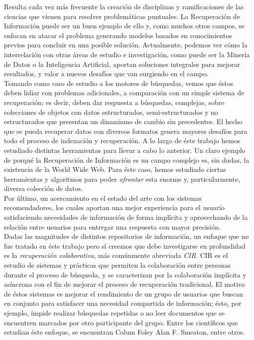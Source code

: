 Resulta cada vez más frecuente la creación de disciplinas y ramificaciones de las ciencias que vienen para resolver problemáticas puntuales. La Recuperación de Información puede ser un buen ejemplo de ello y, como muchos otros campos, se enfocan en atacar el problema generando modelos basados en conocimientos previos para concluir en una posible solución. Actualmente, podemos ver cómo la interrelación con otras áreas de estudio e investigación, como puede ser la Minería de Datos o la Inteligencia Artificial, aportan soluciones integrales para mejorar resultados, y valor a nuevos desafíos que van surgiendo en el campo. \\

Tomando como caso de estudio a los motores de búsquedas, vemos que éstos deben lidiar con problemas adicionales, a comparación con un simple sistema de recuperación; es decir, deben dar respuesta a búsquedas, complejas, sobre colecciones de objetos con datos estructurados, semi-estructurados y no estructurados que presentan un dinamismo de cambio sin precedentes. El hecho que se pueda recuperar datos con diversos formatos genera mayores desafíos para todo el proceso de indexación y recuperación. A lo largo de éste trabajo hemos estudiado distintas herramientas para llevar a cabo lo anterior. Un claro ejemplo de porqué la Recuperación de Información es un campo complejo es, sin dudas, la existencia de la World Wide Web. Para éste caso, hemos estudiado ciertas herramientas y algoritmos para poder \textit{afrontar} esta enorme y, particularmente, diversa colección de datos. \\

Por último, un acercamiento en el estado del arte con los sistemas recomendadores, los  cuales aportan una mejor experiencia para el usuario satisfaciendo necesidades de información de forma implícita y aprovechando de la relación entre usuarios para entregar una respuesta con mayor precisión. \\

Dadas las magnitudes de distintos repositorios de información, un enfoque que no fue tratado en éste trabajo pero sí creemos que debe investigarse en profundidad es la \textit{recuperación colaborativa}, más comúnmente abreviada \textit{CIR}. CIR es el estudio de sistemas y prácticas que permiten la colaboración entre personas durante el proceso de búsqueda, y se caracterizan por la colaboración implícita y asíncrona con el fin de mejorar el proceso de recuperación tradicional. El motivo de éstos sistemas es mejorar el rendimiento de un grupo de usuarios que buscan en conjunto para satisfacer una necesidad compartida de información; ésto, por ejemplo, impide realizar búsquedas repetidas o no leer documentos que se encuentren marcados por otro participante del grupo. Entre los científicos que estudian éste enfoque, se encuentran Colum Foley Alan F. Smeaton, entre otros.